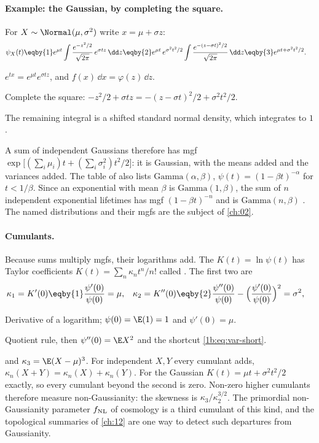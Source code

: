 \paragraph{Example: the Gaussian, by completing the square.}
For $X\sim\Normal(\mu,\sigma^2)$ write $x=\mu+\sigma z$:
\begin{align*}
  \psi_X(t)
  &\eqby{1} e^{\mu t}\int\frac{e^{-z^2/2}}{\sqrt{2\pi}}\,e^{\sigma tz}\,\dd z
   \eqby{2} e^{\mu t}\,e^{\sigma^2t^2/2}\int\frac{e^{-(z-\sigma t)^2/2}}{\sqrt{2\pi}}\,\dd z
   \eqby{3} e^{\mu t+\sigma^2t^2/2} .
\end{align*}
\begin{explain}
  \item $e^{tx}=e^{\mu t}e^{\sigma tz}$, and $f(x)\,\dd x=\varphi(z)\,\dd z$.
  \item Complete the square: $-z^2/2+\sigma tz=-(z-\sigma t)^2/2+\sigma^2t^2/2$.
  \item The remaining integral is a shifted standard normal density, which
        integrates to $1$.
\end{explain}
A sum of independent Gaussians therefore has mgf
$\exp\bigl[(\sum_i\mu_i)t+(\sum_i\sigma_i^2)t^2/2\bigr]$: it is Gaussian, with the
means added and the variances added. The table of  also lists
$\mathrm{Gamma}(\alpha,\beta)$, $\psi(t)=(1-\beta t)^{-\alpha}$ for $t<1/\beta$.
Since an exponential with mean $\beta$ is $\mathrm{Gamma}(1,\beta)$, the sum
of $n$ independent exponential lifetimes has mgf $(1-\beta t)^{-n}$ and is
$\mathrm{Gamma}(n,\beta)$ . The named distributions
and their mgfs are the subject of \cref{ch:02}.

\paragraph{Cumulants.}
Because sums multiply mgfs, their logarithms add. The
 $K(t)=\ln\psi(t)$ has Taylor
coefficients $K(t)=\sum_n\kappa_nt^n/n!$ called 
. The first two are
\begin{align*}
  \kappa_1&=K'(0)\eqby{1}\frac{\psi'(0)}{\psi(0)}=\mu,&
  \kappa_2&=K''(0)\eqby{2}\frac{\psi''(0)}{\psi(0)}-\Bigl(\frac{\psi'(0)}{\psi(0)}\Bigr)^2=\sigma^2,
\end{align*}
\begin{explain}
  \item Derivative of a logarithm; $\psi(0)=\E(1)=1$ and $\psi'(0)=\mu$.
  \item Quotient rule, then $\psi''(0)=\E X^2$ and the shortcut
        \eqref{1b:eq:var-short}.
\end{explain}
and $\kappa_3=\E(X-\mu)^3$. For independent $X,Y$ every cumulant adds,
$\kappa_n(X+Y)=\kappa_n(X)+\kappa_n(Y)$. For the Gaussian
$K(t)=\mu t+\sigma^2t^2/2$ exactly, so every cumulant beyond the second is
zero. Non-zero higher cumulants therefore measure non-Gaussianity: the skewness
is $\kappa_3/\kappa_2^{3/2}$. The primordial non-Gaussianity parameter
$f_{\rm NL}$ of cosmology is a third cumulant of this kind, and the
topological summaries of \cref{ch:12} are one way to detect such departures
from Gaussianity.

